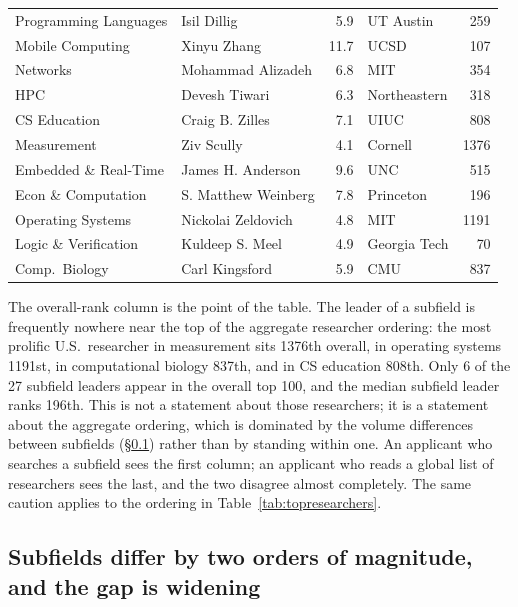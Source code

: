 \documentclass[11pt]{article}
\begin{document}
\begin{table}[p]
\begin{tabular}{llrlr}
Programming Languages & Isil Dillig            & 5.9  & UT Austin     & 259 \\
Mobile Computing      & Xinyu Zhang            & 11.7 & UCSD          & 107 \\
Networks              & Mohammad Alizadeh      & 6.8  & MIT           & 354 \\
HPC                   & Devesh Tiwari          & 6.3  & Northeastern  & 318 \\
CS Education          & Craig B. Zilles        & 7.1  & UIUC          & 808 \\
Measurement           & Ziv Scully             & 4.1  & Cornell       & 1376 \\
Embedded \& Real-Time & James H. Anderson      & 9.6  & UNC           & 515 \\
Econ \& Computation   & S. Matthew Weinberg    & 7.8  & Princeton     & 196 \\
Operating Systems     & Nickolai Zeldovich     & 4.8  & MIT           & 1191 \\
Logic \& Verification & Kuldeep S. Meel        & 4.9  & Georgia Tech  & 70 \\
Comp.\ Biology        & Carl Kingsford         & 5.9  & CMU           & 837 \\
\bottomrule
\end{tabular}
\end{table}

The overall-rank column is the point of the table. The leader of a subfield is
frequently nowhere near the top of the aggregate researcher ordering: the most
prolific U.S.\ researcher in measurement sits 1376th overall, in operating
systems 1191st, in computational biology 837th, and in CS education 808th.
Only 6 of the 27 subfield leaders appear in the overall top 100, and the median
subfield leader ranks 196th. This is not a statement
about those researchers; it is a statement about the aggregate ordering, which
is dominated by the volume differences between subfields
(\S\ref{sec:fields}) rather than by standing within one. An applicant who
searches a subfield sees the first column; an applicant who reads a global list
of researchers sees the last, and the two disagree almost completely. The same
caution applies to the ordering in Table~\ref{tab:topresearchers}.

\subsection{Subfields differ by two orders of magnitude, and the gap is widening}
\label{sec:fields}
\end{document}

